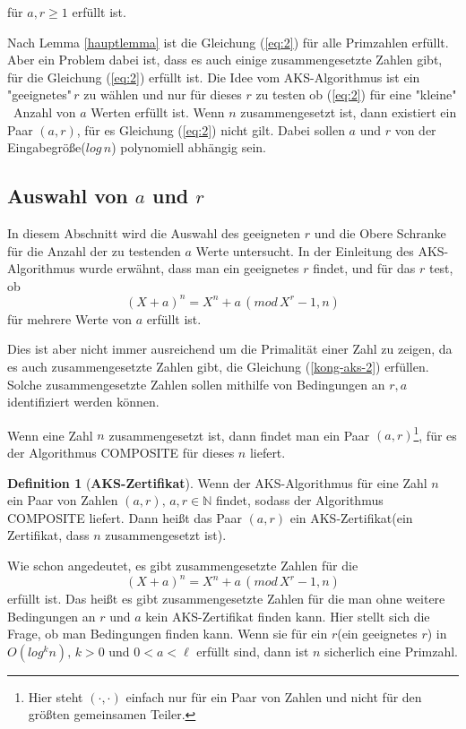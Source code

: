 \documentclass[12pt,oneside]{article}
\theoremstyle{remark}
\theoremstyle{definition}
\newtheorem{definition}{Definition}[section]
\begin{document}
\begin{flushleft}
für $a,r \geq 1$ erfüllt ist.\newline

Nach Lemma \ref{hauptlemma} ist die Gleichung (\ref{eq:2}) für alle Primzahlen erfüllt. Aber ein Problem dabei ist, dass es auch einige zusammengesetzte Zahlen gibt, für die Gleichung (\ref{eq:2}) erfüllt ist. Die Idee vom AKS-Algorithmus ist ein "geeignetes"$\, r$ zu wählen und nur für dieses $r$ zu testen ob (\ref{eq:2}) für eine "kleine" $\,$ Anzahl von $a$ Werten erfüllt ist. Wenn $n$ zusammengesetzt ist, dann existiert ein Paar $(a,r)$, für es Gleichung (\ref{eq:2}) nicht gilt. Dabei sollen $a$ und $r$ von der Eingabegröße($log \, n$) polynomiell abhängig sein. 

\subsection{Auswahl von $a$ und $r$}
In diesem Abschnitt wird die Auswahl des geeigneten $r$ und die Obere Schranke für die Anzahl der zu testenden $a$ Werte untersucht. In der Einleitung des AKS-Algorithmus wurde erwähnt, dass man ein geeignetes $r$ findet, und für das $r$ test, ob 
\begin{equation}\label{kong-aks-2}
    (X + a)^n = X^n + a \, (mod \, X^r - 1, n)
\end{equation}
für mehrere Werte von $a$ erfüllt ist.

Dies ist aber nicht immer ausreichend um die Primalität einer Zahl zu zeigen, da es auch zusammengesetzte Zahlen gibt, die Gleichung (\ref{kong-aks-2}) erfüllen. Solche zusammengesetzte Zahlen sollen mithilfe von Bedingungen an $r,a$ identifiziert werden können.

Wenn eine Zahl $n$ zusammengesetzt ist, dann findet man ein Paar $(a,r)$\footnote{Hier steht $(\cdot,\cdot)$ einfach nur für ein Paar von Zahlen und nicht für den größten gemeinsamen Teiler.}, für es der Algorithmus COMPOSITE für dieses $n$ liefert.

\begin{definition}[\textbf{AKS-Zertifikat}]
Wenn der AKS-Algorithmus für eine Zahl $n$ ein Paar von Zahlen $(a,r), \, a,r \in \mathbb{N}$ findet, sodass der Algorithmus COMPOSITE liefert. Dann heißt das Paar $(a,r)$ ein AKS-Zertifikat(ein Zertifikat, dass $n$ zusammengesetzt ist). 
\end{definition}

Wie schon angedeutet, es gibt zusammengesetzte Zahlen für die 
\begin{equation}\label{iden-aks}
    (X + a)^n = X^n + a \, (mod  \, X^r - 1, n)
\end{equation}
erfüllt ist. Das heißt es gibt zusammengesetzte Zahlen für die man ohne weitere Bedingungen an $r$ und $a$ kein AKS-Zertifikat finden kann. Hier stellt sich die Frage, ob man Bedingungen finden kann. Wenn sie für ein $r$(ein geeignetes $r$) in $O(log^k n), \, k > 0$ und $ 0 < a < \ell$ erfüllt sind, dann ist $n$ sicherlich eine Primzahl.


\end{flushleft}
\end{document}
